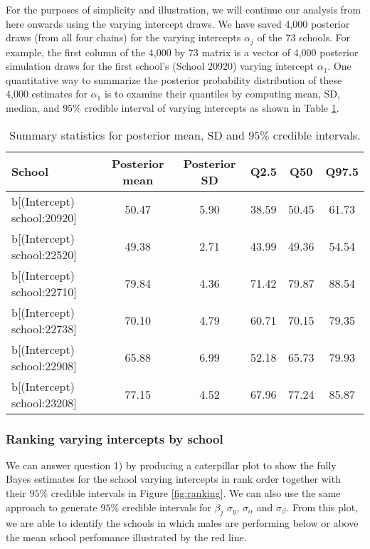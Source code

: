 For the purposes of simplicity and illustration, we will continue our analysis from here onwards using the varying intercept draws. We have saved 4,000 posterior draws (from all four chains) for the varying intercepts $\alpha_{j}$ of the 73 schools. For example, the first column of the 4,000 by 73 matrix is a vector of 4,000 posterior simulation draws for the first school's (School 20920) varying intercept $\alpha_{1}$.  One quantitative way to summarize the posterior probability distribution of these 4,000 estimates for $\alpha_{1}$ is to examine their quantiles by computing mean, SD, median, and $95\%$ credible interval of varying intercepts as shown in Table \ref{tab:summary_data}.

\begin{table}[ht]
	\centering
	\def\arraystretch{1.3}
	{\small
		\begin{tabular}{l | c c c c c}
			School & Posterior mean & Posterior SD & Q2.5 & Q50 & Q97.5\\
			\hline
			b[(Intercept) school:20920] & 50.47 & 5.90 & 38.59 & 50.45 & 61.73 \\
			b[(Intercept) school:22520] & 49.38 & 2.71 & 43.99 & 49.36 & 54.54 \\
			b[(Intercept) school:22710] & 79.84 & 4.36 &  71.42 & 79.87 & 88.54 \\
			b[(Intercept) school:22738] & 70.10 & 4.79 & 60.71 & 70.15 & 79.35  \\
			b[(Intercept) school:22908] & 65.88 & 6.99 & 52.18 & 65.73 & 79.93 \\
			b[(Intercept) school:23208] &  77.15 & 4.52 & 67.96 & 77.24 & 85.87
		\end{tabular}
	}
	\caption{{\small Summary statistics for posterior mean, SD and $95\%$ credible intervals.}}
	\label{tab:summary_data}
\end{table}

\subsubsection{Ranking varying intercepts by school}

We can answer question 1) by producing a caterpillar plot to show the fully Bayes estimates for the school varying intercepts in rank order together with their $95\%$ credible intervals in Figure \ref{fig:ranking}. We can also use the same approach to generate $95\%$ credible intervals for $\beta_j$ $\sigma_y$, $\sigma_\alpha$ and $\sigma_\beta$. From this plot, we are able to identify the schools in which males are performing below or above the mean school perfomance illustrated by the red line.

